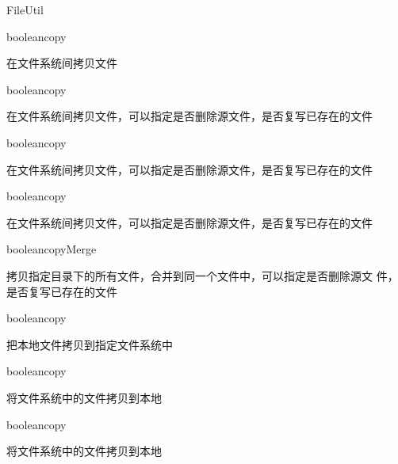 \begin{XeClass}{FileUtil}
    \begin{XeMethod}{\XePublic}{boolean}{copy}
         
 在文件系统间拷贝文件

    \end{XeMethod}

    \begin{XeMethod}{\XePublic}{boolean}{copy}
         
 在文件系统间拷贝文件，可以指定是否删除源文件，是否复写已存在的文件

    \end{XeMethod}

    \begin{XeMethod}{\XePublic}{boolean}{copy}
         
 在文件系统间拷贝文件，可以指定是否删除源文件，是否复写已存在的文件

    \end{XeMethod}

    \begin{XeMethod}{\XePrivate}{boolean}{copy}
         
 在文件系统间拷贝文件，可以指定是否删除源文件，是否复写已存在的文件

    \end{XeMethod}

    \begin{XeMethod}{\XePublic}{boolean}{copyMerge}
         
 拷贝指定目录下的所有文件，合并到同一个文件中，可以指定是否删除源文
 件，是否复写已存在的文件

    \end{XeMethod}

    \begin{XeMethod}{\XePublic}{boolean}{copy}
         
 把本地文件拷贝到指定文件系统中

    \end{XeMethod}

    \begin{XeMethod}{\XePublic}{boolean}{copy}
         
 将文件系统中的文件拷贝到本地

    \end{XeMethod}

    \begin{XeMethod}{\XePrivate}{boolean}{copy}
         
 将文件系统中的文件拷贝到本地

    \end{XeMethod}


\end{XeClass}
